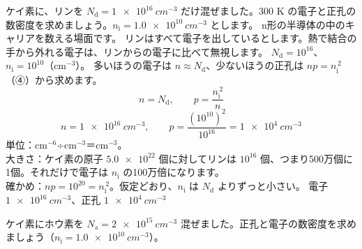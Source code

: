 \label{ph:原-9:ex3}
\begin{phreidai}[リンを混ぜたケイ素の電子と正孔]
ケイ素に、リンを $N_{\mathrm d}=\qty{1e16}{cm^{-3}}$ だけ混ぜました。300 K の電子と正孔の数密度を求めましょう。$n_{\mathrm i}=\qty{1.0e10}{cm^{-3}}$ とします。
\phbamen
n形の半導体の中のキャリアを数える場面です。
\phmushi
リンはすべて電子を出しているとします。熱で結合の手から外れる電子は、リンからの電子に比べて無視します。
\phzu
$N_{\mathrm d}=10^{16}$、$n_{\mathrm i}=10^{10}$（cm$^{-3}$）。
\phriyu
多いほうの電子は $n\approx N_{\mathrm d}$、少ないほうの正孔は $np=n_{\mathrm i}^{\,2}$（④）から求めます。
\phtateru
\[ n=N_{\mathrm d},\qquad p=\frac{n_{\mathrm i}^{\,2}}{n} \]
\phtoku
\[ n=\qty{1e16}{cm^{-3}},\qquad p=\frac{(10^{10})^2}{10^{16}}=\qty{1e4}{cm^{-3}} \]
\phtashikame
単位：cm$^{-6}$÷cm$^{-3}$＝cm$^{-3}$。\\
大きさ：ケイ素の原子 $\num{5.0e22}$ 個に対してリンは $10^{16}$ 個、つまり500万個に1個。それだけで電子は $n_{\mathrm i}$ の100万倍になります。\\
確かめ：$np=10^{20}=n_{\mathrm i}^{\,2}$。仮定どおり、$n_{\mathrm i}$ は $N_{\mathrm d}$ よりずっと小さい。
\kotae 電子 $\qty{1e16}{cm^{-3}}$、正孔 $\qty{1e4}{cm^{-3}}$
\end{phreidai}
\begin{jibun}
ケイ素にホウ素を $N_{\mathrm a}=\qty{2e15}{cm^{-3}}$ 混ぜました。正孔と電子の数密度を求めましょう（$n_{\mathrm i}=\qty{1.0e10}{cm^{-3}}$）。
\end{jibun}


